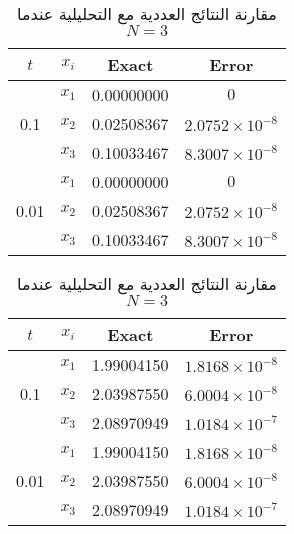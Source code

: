 \begin{example}
\begin{table}[ht]
	\centering
	\renewcommand{\arraystretch}{1.5}
	\begin{english}
		\begin{tabular}{|c|c|c|c|}
			\hline
			$t$ & $x_i$ & Exact & Error\\
			\hline
			\multirow{3}{*}{0.1}  & $x_1$ & 0.00000000  & $0$ \\
			& $x_2$ & 0.02508367  & $2.0752\times10^{-8}$ \\
			& $x_3$ & 0.10033467  & $8.3007\times10^{-8}$ \\
			\hline
			\multirow{3}{*}{0.01} & $x_1$ & 0.00000000  & $0$ \\
			& $x_2$ & 0.02508367  & $2.0752\times10^{-8}$ \\
			& $x_3$ & 0.10033467  & $8.3007\times10^{-8}$ \\
			\hline
		\end{tabular}
	\end{english}
	\label{tab:firstN3}
	\caption{مقارنة النتائج العددية مع التحليلية عندما $N=3$}
\end{table}

\end{example}

\begin{table}[ht]
	\centering
	\renewcommand{\arraystretch}{1.5}
	\begin{english}
		\begin{tabular}{|c|c|c|c|}
			\hline
			$t$ & $x_i$ & Exact & Error\\
			\hline
			\multirow{3}{*}{0.1}  & $x_1$ & 1.99004150  & $1.8168\times10^{-8}$ \\
			& $x_2$ & 2.03987550  & $6.0004\times10^{-8}$ \\
			& $x_3$ & 2.08970949  & $1.0184\times10^{-7}$ \\
			\hline
			\multirow{3}{*}{0.01} & $x_1$ & 1.99004150  & $1.8168\times10^{-8}$ \\
			& $x_2$ & 2.03987550  & $6.0004\times10^{-8}$ \\
			& $x_3$ & 2.08970949  & $1.0184\times10^{-7}$ \\
			\hline
		\end{tabular}
	\end{english}
	\label{tab:secondN3}
	\caption{مقارنة النتائج العددية مع التحليلية عندما $N=3$}
\end{table}

